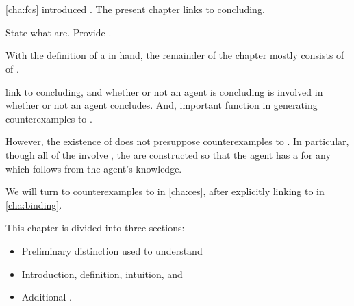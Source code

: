 \chapter{}
\label{cha:requs}

\begin{note}
  \autoref{cha:fcs} introduced .
  The present chapter links  to concluding.

  State what  are.
  Provide .
\end{note}

\begin{note}
  With the definition of a \requ{} in hand, the remainder of the chapter mostly consists of  of .

   link  to concluding, and whether or not an agent is concluding is involved in whether or not an agent concludes.
  And, important function in generating counterexamples to \issueConstraint{}.

  However, the existence of  does not presuppose counterexamples to \issueConstraint{}.
  In particular, though all of the  involve , the  are constructed so that the agent has a  for any \ros{} which follows from the agent's knowledge.

  We will turn to counterexamples to \issueConstraint{} in \autoref{cha:ces}, after explicitly linking  to \qWhyV{} in \autoref{cha:binding}.
\end{note}

\begin{note}
  This chapter is divided into three sections:
  \begin{itemize}
  \item

    Preliminary distinction used to understand 
  \item

    Introduction, definition, intuition, and 
  \item

    Additional .
  \end{itemize}
\end{note}

\section{}
\label{cha:requs:sec:infl}

